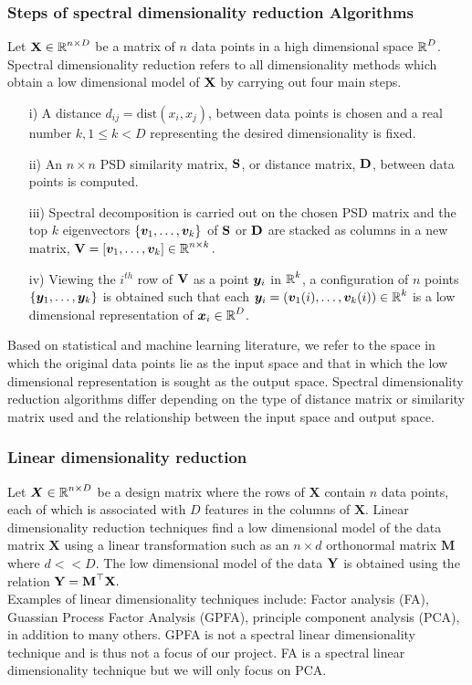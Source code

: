\subsubsection{Steps of spectral dimensionality reduction Algorithms}
Let $\textbf{X} \in \operatorname{\mathbb{R}}^{n \times D}$ be a matrix of $n$ data points in a high dimensional space $\operatorname{\mathbb{R}}^{D}$. Spectral dimensionality reduction refers to all 
dimensionality methods which obtain a low dimensional model of $\textbf{X}$
by carrying out four main steps.
\begin{itemize}
\item[i)] A distance $d_{ij} = \text{dist}(x_{i}, x_{j})$, between data points
is chosen and a real number $k, 1 \leq k < D$ representing the desired dimensionality is fixed.
\item[ii)] An $n \times n$ PSD similarity matrix, $\textbf{S}$, or distance matrix, $\textbf{D}$, between data points is computed.
\item[iii)] Spectral decomposition is carried out on the chosen PSD matrix and
the top $k$ eigenvectors $\{ \boldsymbol{v}_{1}, \ldots, \boldsymbol{v}_{k} \}$ of $\textbf{S}$
or $\textbf{D}$ are stacked as columns in a new matrix, 
$\textbf{V} = [\boldsymbol{v}_{1}, \ldots, \boldsymbol{v}_{k}] \in \operatorname{\mathbb{R}}^{n \times k}.$
\item[iv)] Viewing the $i^{th}$ row of $\textbf{V}$ as a point $\boldsymbol{y}_{i}$
in $\operatorname{\mathbb{R}}^{k}$, a configuration of $n$ points 
$\{\boldsymbol{y}_{1}, \ldots, \boldsymbol{y}_{k} \}$ is obtained such that each
 $\boldsymbol{y}_{i} = (\boldsymbol{v}_{1}(i), \ldots, \boldsymbol{v}_{k}(i)) \in \operatorname{\mathbb{R}}^{k}$
is a low dimensional representation of $\boldsymbol{x}_{i} \in \operatorname{\mathbb{R}}^{D}$.
\end{itemize}

Based on statistical and machine learning literature, we refer to the space 
in which the original data points lie as the input space and that in which
the low dimensional representation is sought as the output space. 
Spectral dimensionality reduction algorithms differ depending on the
type of distance matrix or similarity matrix used and the relationship
between the input space and output space.

\subsubsection{Linear dimensionality  reduction}
Let $\bm{X} \in \operatorname{\mathbb{R}}^{n \times D}$ be a design matrix where the rows of
$\bm{X}$ contain $n$ data points, each of which is associated with $D$ features
in the columns of $\bm{X}$.
Linear dimensionality reduction techniques find a low dimensional model of the data matrix $\textbf{X}$ using a linear transformation such as an $n \times d$ orthonormal matrix $\textbf{M}$ where $d<<D$. The low dimensional model of the data $\textbf{Y}$ is obtained using the relation $\textbf{Y} = \textbf{M}^{\top}\textbf{X}.$\\
Examples of linear dimensionality techniques include: Factor analysis (FA), Guassian Process Factor Analysis (GPFA), principle component analysis (PCA), in addition to many others. GPFA is not a spectral linear dimensionality technique and is thus not a focus of our project. FA is a spectral linear dimensionality technique but we will only focus on PCA.\\ 

